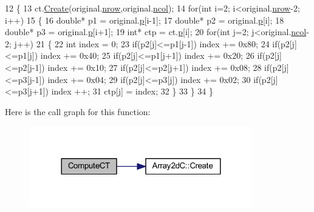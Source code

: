 \begin{DoxyCode}
12 \{
13     ct.\mbox{\hyperlink{class_array2d_c_abfe87be7641dfc586b9e7bffebcca9ec}{Create}}(original.\mbox{\hyperlink{class_array2d_c_a12f690f7195f7674a86a7e1eedbc473c}{nrow}},original.\mbox{\hyperlink{class_array2d_c_a27e0f8f40f644831cd7c750db59dc28a}{ncol}});
14     \textcolor{keywordflow}{for}(\textcolor{keywordtype}{int} i=2; i<original.\mbox{\hyperlink{class_array2d_c_a12f690f7195f7674a86a7e1eedbc473c}{nrow}}-2; i++)
15     \{
16         \textcolor{keywordtype}{double}* p1 = original.\mbox{\hyperlink{class_array2d_c_a727eae5d663d463635cc150e6f771f0d}{p}}[i-1];
17         \textcolor{keywordtype}{double}* p2 = original.\mbox{\hyperlink{class_array2d_c_a727eae5d663d463635cc150e6f771f0d}{p}}[i];
18         \textcolor{keywordtype}{double}* p3 = original.\mbox{\hyperlink{class_array2d_c_a727eae5d663d463635cc150e6f771f0d}{p}}[i+1];
19         \textcolor{keywordtype}{int}* ctp = ct.\mbox{\hyperlink{class_array2d_c_a727eae5d663d463635cc150e6f771f0d}{p}}[i];
20         \textcolor{keywordflow}{for}(\textcolor{keywordtype}{int} j=2; j<original.\mbox{\hyperlink{class_array2d_c_a27e0f8f40f644831cd7c750db59dc28a}{ncol}}-2; j++)
21         \{
22             \textcolor{keywordtype}{int} index = 0;
23             \textcolor{keywordflow}{if}(p2[j]<=p1[j-1]) index += 0x80;
24             \textcolor{keywordflow}{if}(p2[j]<=p1[j]) index += 0x40;
25             \textcolor{keywordflow}{if}(p2[j]<=p1[j+1]) index += 0x20;
26             \textcolor{keywordflow}{if}(p2[j]<=p2[j-1]) index += 0x10;
27             \textcolor{keywordflow}{if}(p2[j]<=p2[j+1]) index += 0x08;
28             \textcolor{keywordflow}{if}(p2[j]<=p3[j-1]) index += 0x04;
29             \textcolor{keywordflow}{if}(p2[j]<=p3[j]) index += 0x02;
30             \textcolor{keywordflow}{if}(p2[j]<=p3[j+1]) index ++;
31             ctp[j] = index;
32         \}
33     \}
34 \}
\end{DoxyCode}
Here is the call graph for this function\+:\nopagebreak
\begin{figure}[H]
\begin{center}
\leavevmode
\includegraphics[width=276pt]{c4-pedestrian-detector_8cpp_a205804b2ee8558313222a898513a9543_cgraph}
\end{center}
\end{figure}
